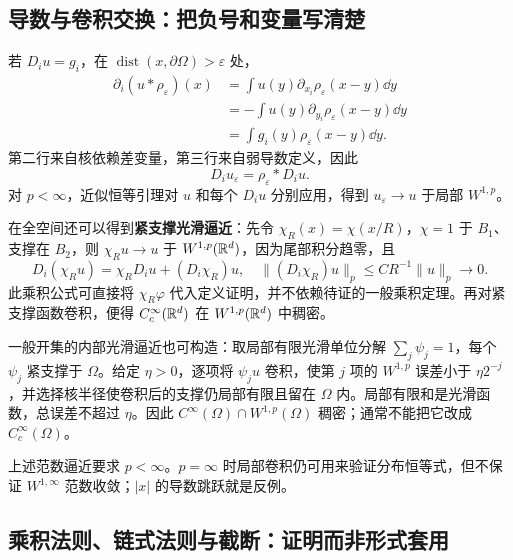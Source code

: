 \subsection{导数与卷积交换：把负号和变量写清楚}

若 $D_i u=g_i$，在 $\operatorname{dist}(x,\partial\Omega)>\varepsilon$ 处，
\begin{align*}
 \partial_i(u*\rho_\varepsilon)(x)
 &=\int u(y)\partial_{x_i}\rho_\varepsilon(x-y)\dd y\\
 &=-\int u(y)\partial_{y_i}\rho_\varepsilon(x-y)\dd y\\
 &=\int g_i(y)\rho_\varepsilon(x-y)\dd y.
\end{align*}
第二行来自核依赖差变量，第三行来自弱导数定义，因此
\begin{equation}
 D_i u_\varepsilon=\rho_\varepsilon*D_i u.
 \label{eq:sobolev-mollifier}
\end{equation}
对 $p<\infty$，近似恒等引理对 $u$ 和每个 $D_i u$ 分别应用，得到 $u_\varepsilon\to u$ 于局部 $W^{1,p}$。

在全空间还可以得到\textbf{紧支撑光滑逼近}：先令 $\chi_R(x)=\chi(x/R)$，$\chi=1$ 于 $B_1$、支撑在 $B_2$，则 $\chi_Ru\to u$ 于 $W^{1,p}(\mathbb R^d)$，因为尾部积分趋零，且
\[
 D_i(\chi_Ru)=\chi_RD_iu+(D_i\chi_R)u,
 \quad\|(D_i\chi_R)u\|_p\le C R^{-1}\|u\|_p\to0.
\]
此乘积公式可直接将 $\chi_R\varphi$ 代入定义证明，并不依赖待证的一般乘积定理。再对紧支撑函数卷积，便得 $C_c^\infty(\mathbb R^d)$ 在 $W^{1,p}(\mathbb R^d)$ 中稠密。

一般开集的内部光滑逼近也可构造：取局部有限光滑单位分解 $\sum_j\psi_j=1$，每个 $\psi_j$ 紧支撑于 $\Omega$。给定 $\eta>0$，逐项将 $\psi_ju$ 卷积，使第 $j$ 项的 $W^{1,p}$ 误差小于 $\eta2^{-j}$，并选择核半径使卷积后的支撑仍局部有限且留在 $\Omega$ 内。局部有限和是光滑函数，总误差不超过 $\eta$。因此 $C^\infty(\Omega)\cap W^{1,p}(\Omega)$ 稠密；通常不能把它改成 $C_c^\infty(\Omega)$。

\begin{warningbox}
上述范数逼近要求 $p<\infty$。$p=\infty$ 时局部卷积仍可用来验证分布恒等式，但不保证 $W^{1,\infty}$ 范数收敛；$|x|$ 的导数跳跃就是反例。
\end{warningbox}

\subsection{乘积法则、链式法则与截断：证明而非形式套用}


